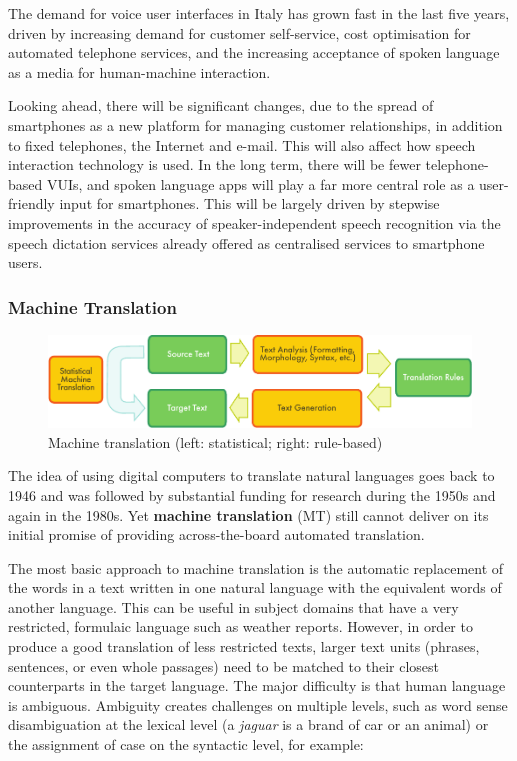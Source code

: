 \begin{multicols}{2}
The demand for voice user interfaces in Italy has grown fast in the last five years, driven by increasing demand for customer self-service, cost optimisation for automated telephone services, and the increasing acceptance of spoken language as a media for human-machine interaction.

Looking ahead, there will be significant changes, due to the spread of smartphones as a new platform for managing customer relationships, in addition to fixed telephones, the Internet and e-mail. This will also affect how speech interaction technology is used. In the long term, there will be fewer telephone-based VUIs, and spoken language apps will play a far more central role as a user-friendly input for smartphones. This will be largely driven by stepwise improvements in the accuracy of speaker-independent speech recognition via the speech dictation services already offered as centralised services to smartphone users.

\subsubsection{Machine Translation}

\begin{figure}[htb]
  \center
  \includegraphics[width=\textwidth]{../_media/english/machine_translation}
  \caption{Machine translation (left: statistical; right: rule-based)}
  \label{fig:mtarch_en}
\end{figure}

The idea of using digital computers to translate natural languages
goes back to 1946 and was followed by substantial funding for research
during the 1950s and again in the 1980s. Yet \textbf{machine
  translation} (MT) still cannot deliver on its initial promise of
providing across-the-board automated translation.  



The most basic approach to machine translation is the automatic replacement of the words in a text written in one natural language with the equivalent words of another language. This can be useful in subject domains that have a very restricted, formulaic language such as weather reports.  However, in order to produce a good translation of less restricted texts, larger text units (phrases, sentences, or even whole passages) need to be matched to their closest counterparts in the target language. The major difficulty is that human language is ambiguous. Ambiguity creates challenges on multiple levels, such as word sense disambiguation at the lexical level (a \textit{jaguar} is a brand of car or an animal) or the assignment of case on the syntactic level, for example:


\end{multicols}
